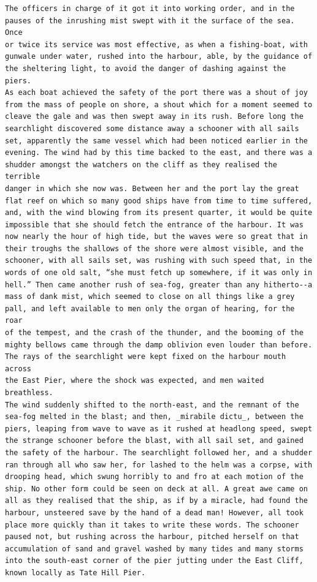 \documentclass{article}
\begin{document}
\begin{verbatim}
The officers in charge of it got it into working order, and in the
pauses of the inrushing mist swept with it the surface of the sea. Once
or twice its service was most effective, as when a fishing-boat, with
gunwale under water, rushed into the harbour, able, by the guidance of
the sheltering light, to avoid the danger of dashing against the piers.
As each boat achieved the safety of the port there was a shout of joy
from the mass of people on shore, a shout which for a moment seemed to
cleave the gale and was then swept away in its rush. Before long the
searchlight discovered some distance away a schooner with all sails
set, apparently the same vessel which had been noticed earlier in the
evening. The wind had by this time backed to the east, and there was a
shudder amongst the watchers on the cliff as they realised the terrible
danger in which she now was. Between her and the port lay the great
flat reef on which so many good ships have from time to time suffered,
and, with the wind blowing from its present quarter, it would be quite
impossible that she should fetch the entrance of the harbour. It was
now nearly the hour of high tide, but the waves were so great that in
their troughs the shallows of the shore were almost visible, and the
schooner, with all sails set, was rushing with such speed that, in the
words of one old salt, “she must fetch up somewhere, if it was only in
hell.” Then came another rush of sea-fog, greater than any hitherto--a
mass of dank mist, which seemed to close on all things like a grey
pall, and left available to men only the organ of hearing, for the roar
of the tempest, and the crash of the thunder, and the booming of the
mighty bellows came through the damp oblivion even louder than before.
The rays of the searchlight were kept fixed on the harbour mouth across
the East Pier, where the shock was expected, and men waited breathless.
The wind suddenly shifted to the north-east, and the remnant of the
sea-fog melted in the blast; and then, _mirabile dictu_, between the
piers, leaping from wave to wave as it rushed at headlong speed, swept
the strange schooner before the blast, with all sail set, and gained
the safety of the harbour. The searchlight followed her, and a shudder
ran through all who saw her, for lashed to the helm was a corpse, with
drooping head, which swung horribly to and fro at each motion of the
ship. No other form could be seen on deck at all. A great awe came on
all as they realised that the ship, as if by a miracle, had found the
harbour, unsteered save by the hand of a dead man! However, all took
place more quickly than it takes to write these words. The schooner
paused not, but rushing across the harbour, pitched herself on that
accumulation of sand and gravel washed by many tides and many storms
into the south-east corner of the pier jutting under the East Cliff,
known locally as Tate Hill Pier.


\end{verbatim}
\end{document}
